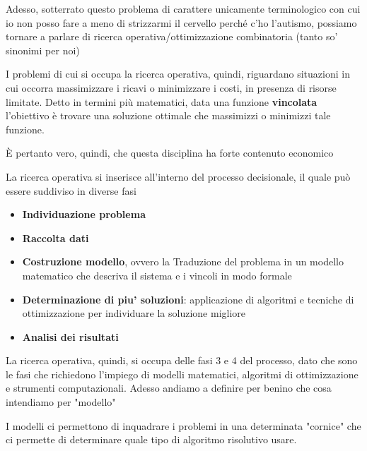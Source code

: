 \documentclass{report}
\begin{document}
Adesso, sotterrato questo problema di carattere unicamente terminologico con cui io non posso fare a meno di strizzarmi il cervello perché c'ho l'autismo, possiamo tornare a parlare di ricerca operativa/ottimizzazione combinatoria (tanto so' sinonimi per noi)

I problemi di cui si occupa la ricerca operativa, quindi, riguardano situazioni in cui occorra massimizzare i ricavi o minimizzare i costi, in presenza di risorse limitate. Detto in termini più matematici, data una funzione \textbf{vincolata} l'obiettivo è trovare una soluzione ottimale che massimizzi o minimizzi tale funzione.

È pertanto vero, quindi, che questa disciplina ha forte contenuto economico

La ricerca operativa si inserisce all'interno del processo decisionale, il quale può essere suddiviso in diverse fasi
\begin{itemize}
\item \textbf{Individuazione problema}
  \item \textbf{Raccolta dati}
    \item \textbf{Costruzione modello}, ovvero la Traduzione del problema in un modello matematico che descriva il sistema e i vincoli in modo formale
      \item \textbf{Determinazione di piu' soluzioni}: applicazione di algoritmi e tecniche di ottimizzazione per individuare la soluzione migliore 
  \item \textbf{Analisi dei risultati}
\end{itemize}

La ricerca operativa, quindi, si occupa delle fasi 3 e 4 del processo, dato che sono le fasi che richiedono l’impiego di modelli matematici, algoritmi di ottimizzazione e strumenti computazionali. Adesso andiamo a definire per benino che cosa intendiamo per "modello" 

I modelli ci permettono di inquadrare i problemi in una determinata "cornice" che ci permette di determinare quale tipo di algoritmo risolutivo usare.
\end{document}
